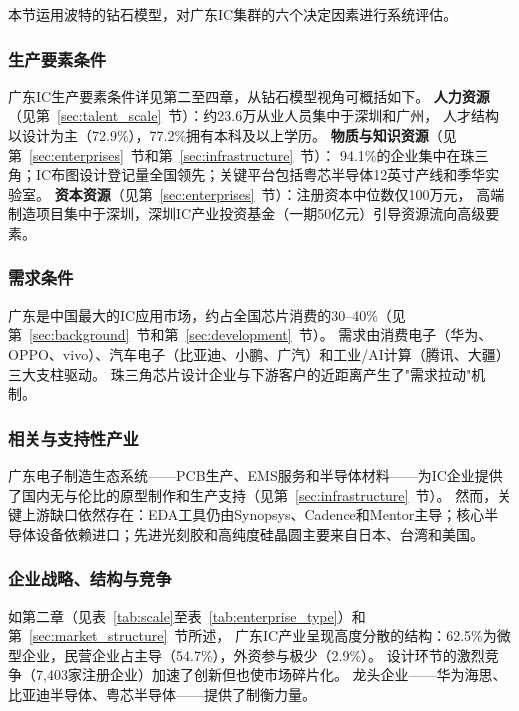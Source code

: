 \documentclass[12pt,a4paper]{article}
\begin{document}
本节运用波特的钻石模型，对广东IC集群的六个决定因素进行系统评估。

\subsubsection{生产要素条件}

广东IC生产要素条件详见第二至四章，从钻石模型视角可概括如下。
\textbf{人力资源}（见第~\ref{sec:talent_scale}~节）：约23.6万从业人员集中于深圳和广州，
人才结构以设计为主（72.9\%），77.2\%拥有本科及以上学历。
\textbf{物质与知识资源}（见第~\ref{sec:enterprises}~节和第~\ref{sec:infrastructure}~节）：
94.1\%的企业集中在珠三角；IC布图设计登记量全国领先；关键平台包括粤芯半导体12英寸产线和季华实验室。
\textbf{资本资源}（见第~\ref{sec:enterprises}~节）：注册资本中位数仅100万元，
高端制造项目集中于深圳，深圳IC产业投资基金（一期50亿元）引导资源流向高级要素。

\subsubsection{需求条件}

广东是中国最大的IC应用市场，约占全国芯片消费的30--40\%（见第~\ref{sec:background}~节和第~\ref{sec:development}~节）。
需求由消费电子（华为、OPPO、vivo）、汽车电子（比亚迪、小鹏、广汽）和工业/AI计算（腾讯、大疆）三大支柱驱动。
珠三角芯片设计企业与下游客户的近距离产生了"需求拉动"机制。

\subsubsection{相关与支持性产业}

广东电子制造生态系统——PCB生产、EMS服务和半导体材料——为IC企业提供了国内无与伦比的原型制作和生产支持（见第~\ref{sec:infrastructure}~节）。
然而，关键上游缺口依然存在：EDA工具仍由Synopsys、Cadence和Mentor主导；核心半导体设备依赖进口；先进光刻胶和高纯度硅晶圆主要来自日本、台湾和美国。

\subsubsection{企业战略、结构与竞争}

如第二章（见表~\ref{tab:scale}至表~\ref{tab:enterprise_type}）和第~\ref{sec:market_structure}~节所述，
广东IC产业呈现高度分散的结构：62.5\%为微型企业，民营企业占主导（54.7\%），外资参与极少（2.9\%）。
设计环节的激烈竞争（7,403家注册企业）加速了创新但也使市场碎片化。
龙头企业——华为海思、比亚迪半导体、粤芯半导体——提供了制衡力量。
\end{document}
